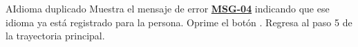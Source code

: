 \begin{UCtrayectoriaA}{A}{Idioma duplicado}
	\UCpaso Muestra el mensaje de error \hyperlink{mMSG04}{\bf MSG-04} indicando que ese idioma ya está registrado para la persona.
	\UCpaso[\UCactor] Oprime el botón .
	\UCpaso Regresa al paso 5 de la trayectoria principal.
\end{UCtrayectoriaA}


